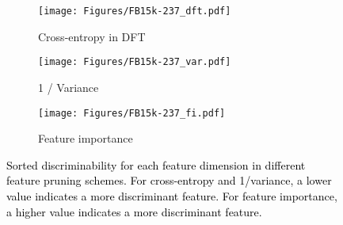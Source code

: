 \documentclass{article}
\begin{document}
\begin{figure*}[t]
\color{black}
        \begin{subfigure}[b]{0.32\textwidth}
        \centering
         \texttt{[image: Figures/FB15k-237\_dft.pdf]}
        \caption{Cross-entropy in DFT}
        \end{subfigure}
        \hfill
        \begin{subfigure}[b]{0.32\textwidth}
        \centering
         \texttt{[image: Figures/FB15k-237\_var.pdf]}
        \caption{1 / Variance}
        \end{subfigure}
        \hfill
        \begin{subfigure}[b]{0.32\textwidth}
        \centering
         \texttt{[image: Figures/FB15k-237\_fi.pdf]}
        \caption{Feature importance}
        \end{subfigure}
        \hfill
\caption{\textcolor{black}{Sorted discriminability for each feature dimension in different feature pruning schemes. For cross-entropy and 1/variance, a lower value indicates a more discriminant feature. For feature importance, a higher value indicates a more discriminant feature.}}
\label{fig:dft}
\end{figure*}
\end{document}
